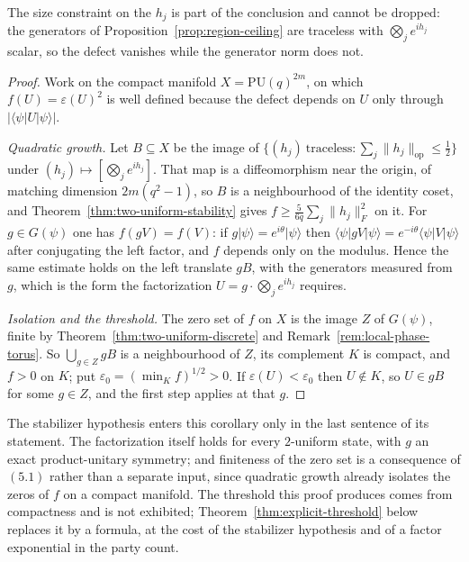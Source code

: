 The size constraint on the \(h_j\) is part of the conclusion and cannot be
dropped: the generators of Proposition~\ref{prop:region-ceiling} are
traceless with \(\bigotimes_je^{ih_j}\) scalar, so the defect vanishes
while the generator norm does not.

\begin{proof}
Work on the compact manifold \(X=\mathrm{PU}(q)^{2m}\), on which
\(f(U)=\varepsilon(U)^2\) is well defined because the defect depends on
\(U\) only through \(\lvert\langle\psi\rvert U\lvert\psi\rangle\rvert\).

\emph{Quadratic growth.}  Let \(B\subseteq X\) be the image of
\(\{(h_j)\ \text{traceless}:\sum_j\lVert h_j\rVert_{\mathrm{op}}
\leq\frac12\}\) under \((h_j)\mapsto[\bigotimes_je^{ih_j}]\).  That map is
a diffeomorphism near the origin, of matching dimension
\(2m(q^2-1)\), so \(B\) is a neighbourhood of the identity coset, and
Theorem~\ref{thm:two-uniform-stability} gives
\(f\geq\frac5{6q}\sum_j\lVert h_j\rVert_F^2\) on it.  For \(g\in G(\psi)\)
one has \(f(gV)=f(V)\): if \(g\lvert\psi\rangle=e^{i\theta}\lvert\psi\rangle\)
then \(\langle\psi\rvert g V\lvert\psi\rangle
=e^{-i\theta}\langle\psi\rvert V\lvert\psi\rangle\) after conjugating the
left factor, and \(f\) depends only on the modulus.  Hence the same estimate
holds on the left translate \(gB\), with the generators measured from \(g\),
which is the form the factorization \(U=g\cdot\bigotimes_je^{ih_j}\) requires.

\emph{Isolation and the threshold.}  The zero set of \(f\) on \(X\) is the
image \(Z\) of \(G(\psi)\), finite by
Theorem~\ref{thm:two-uniform-discrete} and
Remark~\ref{rem:local-phase-torus}.  So \(\bigcup_{g\in Z}gB\) is a
neighbourhood of \(Z\), its complement \(K\) is compact, and \(f>0\) on
\(K\); put \(\varepsilon_0=(\min_Kf)^{1/2}>0\).  If
\(\varepsilon(U)<\varepsilon_0\) then \(U\notin K\), so \(U\in gB\) for
some \(g\in Z\), and the first step applies at that \(g\).
\end{proof}

The stabilizer hypothesis enters this corollary only in the last sentence
of its statement.  The factorization itself holds for every \(2\)-uniform
state, with \(g\) an exact product-unitary symmetry; and finiteness of the
zero set is a consequence of \((5.1)\) rather than a separate input, since
quadratic growth already isolates the zeros of \(f\) on a compact manifold.
The threshold this proof produces comes from compactness and is not
exhibited; Theorem~\ref{thm:explicit-threshold} below replaces it by a
formula, at the cost of the stabilizer hypothesis and of a factor
exponential in the party count.

